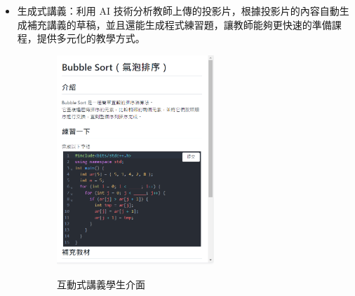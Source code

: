 \documentclass[12pt]{article}
\begin{document}
\begin{enumerate}
\begin{enumerate}
\begin{enumerate}[label=(\arabic*)]
\begin{itemize}
            \item 生成式講義：利用 AI 技術分析教師上傳的投影片，根據投影片的內容自動生成補充講義的草稿，並且還能生成程式練習題，讓教師能夠更快速的準備課程，提供多元化的教學方式。
          \end{itemize}
          \begin{figure}[H]
            \begin{subfigure}{0.45\linewidth}
              \centering
              \href{https://raw.githubusercontent.com/programingtw/proglearn-plan/main/img/interactiveMeterial.png}{ 
                \includegraphics[width=0.65\textwidth]{./img/interactiveMeterial.png}
              }
              \caption{互動式講義學生介面}
              \label{active}
            \end{subfigure}
            \begin{subfigure}{0.45\linewidth}
              \centering
              \href{https://raw.githubusercontent.com/programingtw/proglearn-plan/main/img/interactiveMeterial.png}{ 
}
\end{subfigure}
\end{figure}
\end{enumerate}
\end{enumerate}
\end{enumerate}
\end{document}
